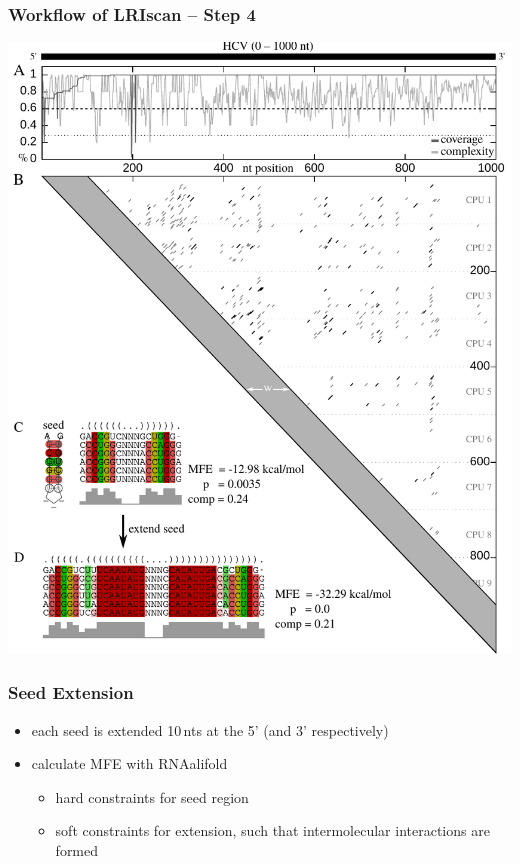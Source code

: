 \begin{frame}[c]\frametitle{Workflow of LRIscan -- Step 4}
	\begin{center}
		\includegraphics[height=0.9\textheight]{figures/lri_workflow_final.pdf}
	\end{center}
\end{frame}

\begin{frame}[c]\frametitle{Seed Extension}
	\begin{itemize}
		\item each seed is extended 10\,nts at the 5' (and 3' respectively)
		\item calculate MFE with RNAalifold
		\begin{itemize}
			\item hard constraints for seed region
			\item soft constraints for extension, such that intermolecular interactions are formed
		\end{itemize}
	\end{itemize}
\end{frame}

